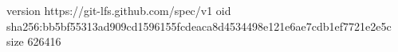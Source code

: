 version https://git-lfs.github.com/spec/v1
oid sha256:bb5bf55313ad909cd1596155fcdeaca8d4534498e121e6ae7cdb1ef7721e2e5c
size 626416
